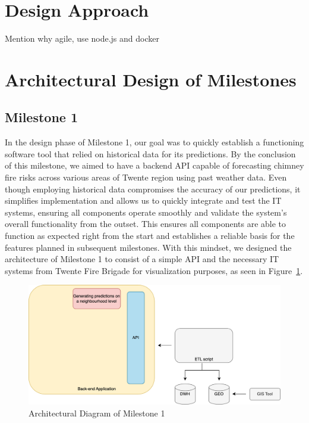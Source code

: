 \documentclass{utitcphd_overleaf}
\begin{document}
\section{Design Approach}

Mention why agile, use node.js and docker

\section{Architectural Design of Milestones}

\subsection{Milestone 1}

In the design phase of Milestone 1, our goal was to quickly establish a functioning software tool that relied on historical data for its predictions. By the conclusion of this milestone, we aimed to have a backend API capable of forecasting chimney fire risks across various areas of Twente region using past weather data. Even though employing historical data compromises the accuracy of our predictions, it simplifies implementation and allows us to quickly integrate and test the IT systems, ensuring all components operate smoothly and validate the system's overall functionality from the outset. This ensures all components are able to function as expected right from the start and establishes a reliable basis for the features planned in subsequent milestones. With this mindset, we designed the architecture of Milestone 1 to consist of a simple API and the necessary IT systems from Twente Fire Brigade for visualization purposes, as seen in Figure~\ref{fig:iteration_1_arch}.

\begin{figure}[ht]
  \centering
  \includegraphics[width=1\textwidth]{my_images/milestones/iteration_1_arch.png}
  \caption{Architectural Diagram of Milestone 1}
  \label{fig:iteration_1_arch}
\end{figure}
\end{document}
